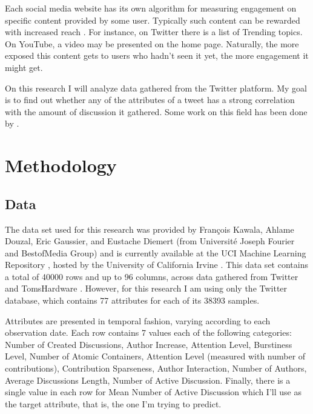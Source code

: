 \documentclass[11pt]{article}
\begin{document}
Each social media website has its own algorithm for measuring engagement on specific content provided by some user. Typically such content can be rewarded with increased reach \cite{milan2015algorithms}. For instance, on Twitter there is a list of Trending topics. On YouTube, a video may be presented on the home page. Naturally, the more exposed this content gets to users who hadn't seen it yet, the more engagement it might get.

On this research I will analyze data gathered from the Twitter platform. My goal is to find out whether any of the attributes of a tweet has a strong correlation with the amount of discussion it gathered.  Some work on this field has been done by \cite{kawala:hal-00881395}. 


\section {Methodology}
\label{method}

\subsection {Data}
\label{data}
The data set used for this research was provided by François Kawala, Ahlame Douzal, Eric Gaussier, and Eustache Diemert (from Université Joseph Fourier and BestofMedia Group) and is currently available at the UCI Machine Learning Repository \cite{sets}, hosted by the University of California Irvine \cite{re3dataorg}. This data set contains a total of 40000 rows and up to 96 columns, across data gathered from Twitter and TomsHardware \cite{team}. However, for this research I am using only the Twitter database, which contains 77 attributes for each of its 38393 samples.

Attributes are presented in temporal fashion, varying according to each observation date. Each row contains 7 values each of the following categories: Number of Created Discussions, Author Increase, Attention Level, Burstiness Level, Number of Atomic Containers, Attention Level (measured with number of contributions), Contribution Sparseness, Author Interaction, Number of Authors, Average Discussions Length, Number of Active Discussion. Finally, there is a single value in each row for Mean Number of Active Discussion which I'll use as the target attribute, that is, the one I'm trying to predict.
\end{document}
